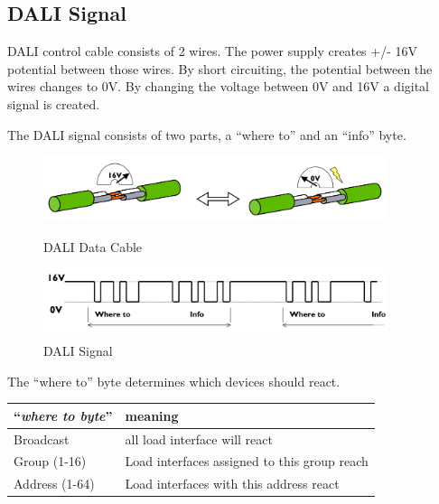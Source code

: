 \documentclass{article}
\begin{document}
\subsection{DALI Signal}
DALI control cable consists of 2 wires. The power supply creates +/- 16V potential between those wires. By short circuiting, the potential between the wires changes to 0V. By changing the voltage between 0V and 16V a digital signal is created.

The DALI signal consists of two parts, a ``where to'' and an ``info'' byte.


\begin{figure}[ht]
\centering
\begin{minipage}[b]{0.45\linewidth}
\includegraphics[width= 0.9\textwidth]{images/datacable.jpg}
\caption{DALI Data Cable}
\end{minipage}
\quad
\begin{minipage}[b]{0.45\linewidth}
\includegraphics[width = 0.9\textwidth]{images/signal.jpg}
\caption{DALI Signal}
\label{fig:minipage2}
\end{minipage}
\end{figure}


The ``where to'' byte determines which devices should react.
\begin{center}
\begin{tabular}{|l|p{}|}
\hline 
\textbf{``\textit{where to byte}''} & \textbf{meaning} \\ \hline
Broadcast 		& all load interface will react \\ \hline
Group (1-16) 	& Load interfaces assigned to this group reach \\ \hline
Address (1-64)	& Load interfaces with this address react \\ \hline

\end{tabular}
\end{center}
\end{document}
